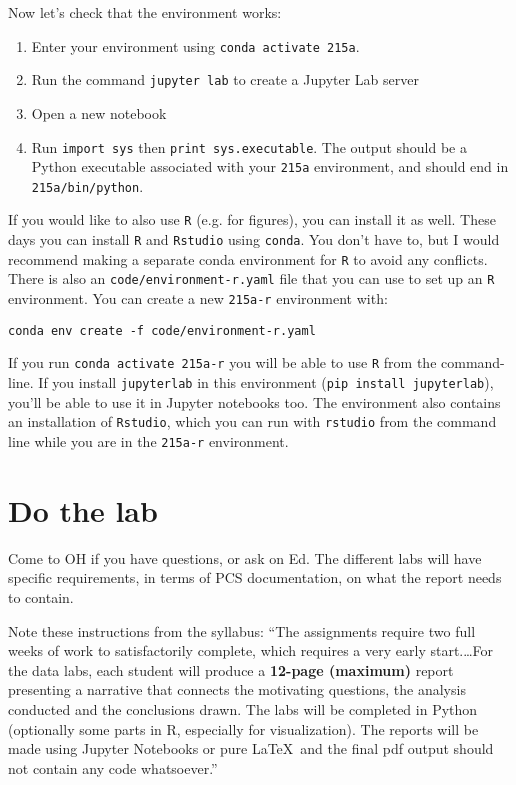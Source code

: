 \documentclass[letterpaper,12pt]{article}
\begin{document}
Now let's check that the environment works:
\begin{enumerate}
    \item Enter your environment using \texttt{conda activate 215a}.
    \item Run the command \texttt{jupyter lab} to create a Jupyter Lab server
    \item Open a new notebook
    \item Run \texttt{import sys} then \texttt{print sys.executable}. The output should be a Python executable associated with your \texttt{215a} environment, and should end in \texttt{215a/bin/python}.
\end{enumerate}
If you would like to also use \texttt{R} (e.g. for figures), you can install it as well. These days you can install \texttt{R} and \texttt{Rstudio} using \texttt{conda}. You don't have to, but I would recommend making a separate conda environment for \texttt{R} to avoid any conflicts. There is also an \texttt{code/environment-r.yaml} file that you can use to set up an \texttt{R} environment. You can create a new \texttt{215a-r} environment with:
\begin{verbatim}
conda env create -f code/environment-r.yaml
\end{verbatim}
If you run \texttt{conda activate 215a-r} you will be able to use \texttt{R} from the command-line. If you install \texttt{jupyterlab} in this environment (\texttt{pip install jupyterlab}), you'll be able to use it in Jupyter notebooks too. The environment also contains an installation of \texttt{Rstudio}, which you can run with \texttt{rstudio} from the command line while you are in the \texttt{215a-r} environment.

\section{Do the lab}
Come to OH if you have questions, or ask on Ed. The different labs will have specific requirements, in terms of PCS documentation, on what the report needs to contain.

Note these instructions from the syllabus:
``The assignments require two full weeks of work to satisfactorily complete, which requires a very early start.\ldots For the data labs, each student will produce a \textbf{12-page (maximum)} report presenting a narrative that connects the motivating
questions, the analysis conducted and the conclusions drawn. The labs will be completed in Python
(optionally some parts in R, especially for visualization). The reports will be made using Jupyter
Notebooks or pure \LaTeX\ and the final pdf output should not contain any code whatsoever.''
\end{document}
